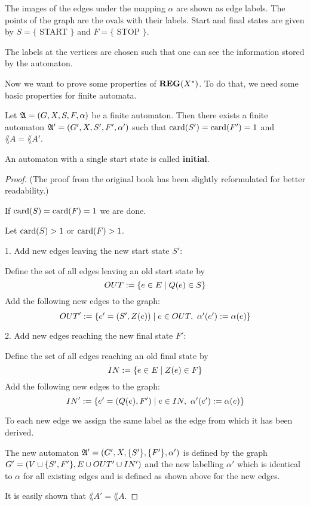 The images of the edges under the mapping $\alpha$ are shown as edge labels. The
points of the graph are the ovals with their labels. Start and final states are
given by $S = \{$ START $\}$ and $F = \{$ STOP $\}$.

The labels at the vertices are chosen such that one can see the information
stored by the automaton.

Now we want to prove some properties of $\mbox{{\bf REG}}(X^*)$. To do that, we need
some basic properties for finite automata.

\begin{lemma}
Let $\mbox{$\mathfrak{A}$} = (G, X, S, F, \alpha)$ be a finite automaton. Then there
exists a finite automaton $\mbox{$\mathfrak{A'}$} = (G', X, S', F', \alpha')$ such that
$\mathrm{card}({S'}) = \mathrm{card}({F'}) = 1$ and $\lang{A} = \lang{A'}$.
\end{lemma}

An automaton with a single start state is called {\bf initial}.

\begin{proof}
(The proof from the original book has been slightly reformulated for better
readability.)

If $\mathrm{card}({S}) = \mathrm{card}({F}) = 1$ we are done.

Let $\mathrm{card}({S}) > 1$ or $\mathrm{card}({F}) > 1$.

1. Add new edges leaving the new start state $S'$:

Define the set of all edges leaving an old start state by
\[ OUT := \mbox{$\{e \in E \mid Q(e) \in S\}$} \]
Add the following new edges to the graph:
\[ OUT' := \setof{e' = (S', Z(e)) \mid e \in OUT,\ \alpha'(e') := \alpha(e)} \]

2. Add new edges reaching the new final state $F'$:

Define the set of all edges reaching an old final state by
\[ IN := \mbox{$\{e \in E \mid Z(e) \in F\}$} \]
Add the following new edges to the graph:
\[ IN' := \setof{e' = (Q(e), F') \mid e \in IN,\ \alpha'(e') := \alpha(e)} \]

To each new edge we assign the same label as the edge from which it has been
derived.

The new automaton $\mbox{$\mathfrak{A'}$} = (G', X, \mbox{$\{S'\}$}, \mbox{$\{F'\}$}, \alpha')$ is
defined by the graph $G' = (V \cup \mbox{$\{S', F'\}$}, E \cup OUT' \cup IN')$
and the new labelling $\alpha'$ which is identical to $\alpha$ for all existing 
edges and is defined as shown above for the new edges.

It is easily shown that $\lang{A'} = \lang{A}$.
\end{proof}


